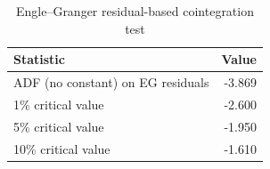\begin{table}

\caption{\label{tab:engle-granger}Engle--Granger residual-based cointegration test}
\centering
\begin{tabular}[t]{lr}
\toprule
Statistic & Value\\
\midrule
ADF (no constant) on EG residuals & -3.869\\
1\% critical value & -2.600\\
5\% critical value & -1.950\\
10\% critical value & -1.610\\
\bottomrule
\end{tabular}
\end{table}
